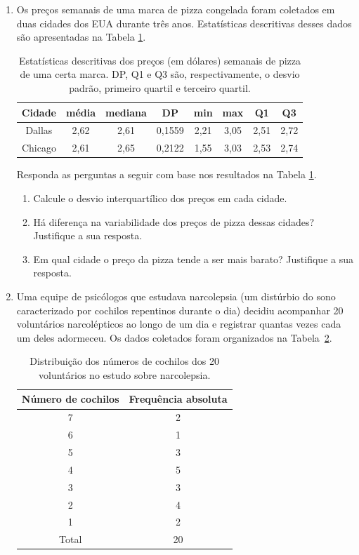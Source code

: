 \documentclass{article}
\begin{document}
\begin{enumerate}
	\item Os preços semanais de uma marca de pizza congelada foram coletados em duas cidades dos EUA durante três anos. Estatísticas descritivas desses dados são apresentadas na Tabela \ref{tab:preco_pizza}.	
	\begin{table}[htp]
	\centering
	\caption{Estatísticas descritivas dos preços (em dólares) semanais de pizza de uma certa marca. DP, Q1 e Q3 são, respectivamente, o desvio padrão, primeiro quartil e terceiro quartil.}
	\begin{tabular}{c|ccccccc}
	\hline
	Cidade & média & mediana & DP & min & max & Q1 & Q3 \\
	\hline
	Dallas & 2,62 & 2,61 & 0,1559 & 2,21 & 3,05 & 2,51 & 2,72 \\
	Chicago & 2,61 & 2,65 & 0,2122 & 1,55 & 3,03 & 2,53 & 2,74 \\
	\hline
	\end{tabular}
	\label{tab:preco_pizza}
	\end{table}
	
	Responda as perguntas a seguir com base nos resultados na Tabela \ref{tab:preco_pizza}.	
	\begin{enumerate}
	\item Calcule o desvio interquartílico dos preços em cada cidade.
	\item Há diferença na variabilidade dos preços de pizza dessas cidades? Justifique a sua resposta.
	\item Em qual cidade o preço da pizza tende a ser mais barato? Justifique a sua resposta.
	\end{enumerate}
	
	\item Uma equipe de psicólogos que estudava narcolepsia (um distúrbio do sono caracterizado por cochilos repentinos durante o dia) decidiu acompanhar 20 voluntários narcolépticos ao longo de um dia e registrar quantas vezes cada um deles adormeceu. Os dados coletados foram organizados na Tabela~\ref{t:narcolepsia}.
	\begin{table}[htp]
	\centering
	\caption{Distribuição dos números de cochilos dos 20 voluntários no estudo sobre narcolepsia. }
	\label{t:narcolepsia}
	\begin{tabular}{c|c}
	\hline
	Número de cochilos & Frequência absoluta \\
	\hline
7 & 2 \\
6 & 1\\
5 & 3\\
4 & 5\\
3 & 3\\
2 & 4\\
1 & 2\\
\hline
Total & 20 \\
	\hline
	\end{tabular}
	\end{table}
	

\end{enumerate}
\end{document}
